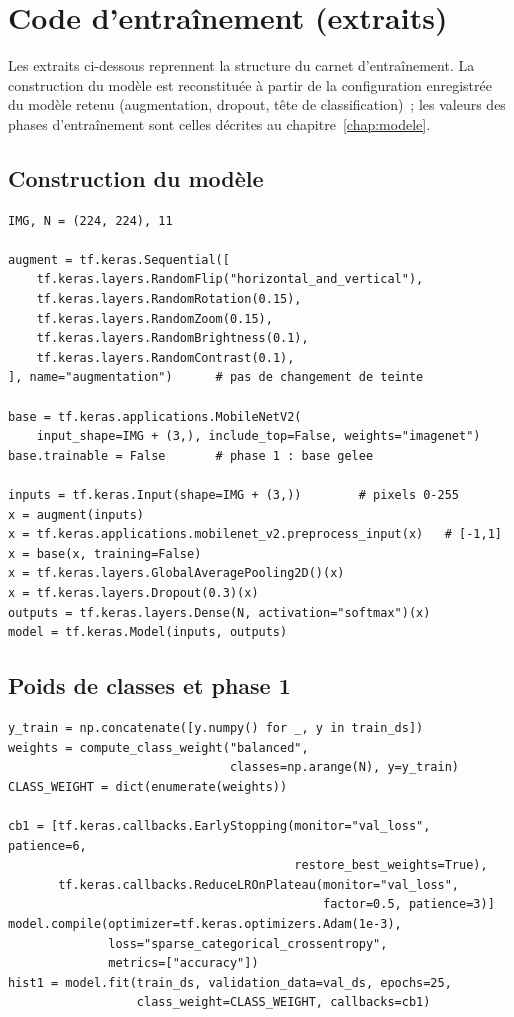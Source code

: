 \appendix

\chapter{Code d’entraînement (extraits)}\label{app:code}

Les extraits ci-dessous reprennent la structure du carnet d’entraînement. La construction du modèle est reconstituée à partir de la configuration enregistrée du modèle retenu (augmentation, dropout, tête de classification)~; les valeurs des phases d’entraînement sont celles décrites au chapitre~\ref{chap:modele}.

\section{Construction du modèle}

\begin{lstlisting}[language=PythonK]
IMG, N = (224, 224), 11

augment = tf.keras.Sequential([
    tf.keras.layers.RandomFlip("horizontal_and_vertical"),
    tf.keras.layers.RandomRotation(0.15),
    tf.keras.layers.RandomZoom(0.15),
    tf.keras.layers.RandomBrightness(0.1),
    tf.keras.layers.RandomContrast(0.1),
], name="augmentation")      # pas de changement de teinte

base = tf.keras.applications.MobileNetV2(
    input_shape=IMG + (3,), include_top=False, weights="imagenet")
base.trainable = False       # phase 1 : base gelee

inputs = tf.keras.Input(shape=IMG + (3,))        # pixels 0-255
x = augment(inputs)
x = tf.keras.applications.mobilenet_v2.preprocess_input(x)   # [-1,1]
x = base(x, training=False)
x = tf.keras.layers.GlobalAveragePooling2D()(x)
x = tf.keras.layers.Dropout(0.3)(x)
outputs = tf.keras.layers.Dense(N, activation="softmax")(x)
model = tf.keras.Model(inputs, outputs)
\end{lstlisting}

\section{Poids de classes et phase 1}

\begin{lstlisting}[language=PythonK]
y_train = np.concatenate([y.numpy() for _, y in train_ds])
weights = compute_class_weight("balanced",
                               classes=np.arange(N), y=y_train)
CLASS_WEIGHT = dict(enumerate(weights))

cb1 = [tf.keras.callbacks.EarlyStopping(monitor="val_loss", patience=6,
                                        restore_best_weights=True),
       tf.keras.callbacks.ReduceLROnPlateau(monitor="val_loss",
                                            factor=0.5, patience=3)]
model.compile(optimizer=tf.keras.optimizers.Adam(1e-3),
              loss="sparse_categorical_crossentropy",
              metrics=["accuracy"])
hist1 = model.fit(train_ds, validation_data=val_ds, epochs=25,
                  class_weight=CLASS_WEIGHT, callbacks=cb1)
\end{lstlisting}

